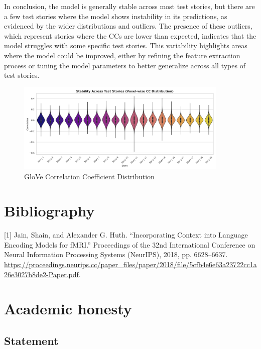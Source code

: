 \documentclass[11pt,letterpaper]{article}
\begin{document}
In conclusion, the model is generally stable across most test stories, but there are a few test stories where the model shows instability in its predictions, as evidenced by the wider distributions and outliers. The presence of these outliers, which represent stories where the CCs are lower than expected, indicates that the model struggles with some specific test stories. This variability highlights areas where the model could be improved, either by refining the feature extraction process or tuning the model parameters to better generalize across all types of test stories.

\begin{figure}[h]
    \centering
    \includegraphics[width=0.9\textwidth]{figs/cc_violin_plot_stability.png}
    \caption{GloVe Correlation Coefficient Distribution}
    \label{fig:violin_glove}
\end{figure}

\newpage
\sloppy
\section{Bibliography}

[1] Jain, Shain, and Alexander G. Huth. “Incorporating Context into Language Encoding Models for fMRI.” Proceedings of the 32nd International Conference on Neural Information Processing Systems (NeurIPS), 2018, pp. 6628–6637. \url{https://proceedings.neurips.cc/paper_files/paper/2018/file/5cfb4e6e63a23722cc1a26e3027b8de2-Paper.pdf}.



\appendix

\vspace{1em} %
\section{Academic honesty}

\vspace{1em} %
\subsection{Statement}
\vspace{0.5em} %
\end{document}
